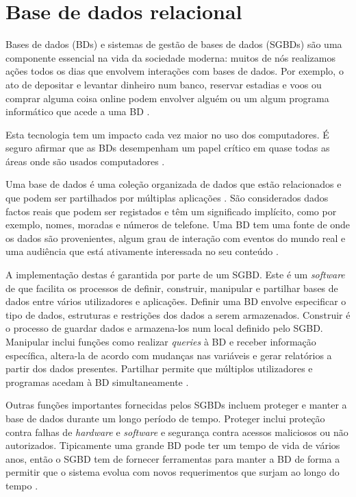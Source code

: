 \documentclass[11pt,twoside,a4paper]{report}
\begin{document}
\section{Base de dados relacional}
Bases de dados (BDs) e sistemas de gestão de bases de dados (SGBDs) são uma componente essencial na vida da sociedade moderna: muitos de nós realizamos ações todos os dias que envolvem interações com bases de dados. Por exemplo, o ato de depositar e levantar dinheiro num banco, reservar estadias e voos ou comprar alguma coisa online podem envolver alguém ou um algum programa informático que acede a uma BD \cite{Elmasri:2010:FDS:1855347}.\par
Esta tecnologia tem um impacto cada vez maior no uso dos computadores. É seguro afirmar que as BDs desempenham um papel crítico em quase todas as áreas onde são usados computadores \cite{Elmasri:2010:FDS:1855347}.\par
Uma base de dados é uma coleção organizada de dados que estão relacionados e que podem ser partilhados por múltiplas aplicações \cite{definicao_base_dados}. São considerados dados factos reais que podem ser registados e têm um significado implícito, como por exemplo, nomes, moradas e números de telefone. Uma BD tem uma fonte de onde os dados são provenientes, algum grau de interação com eventos do mundo real e uma audiência que está ativamente interessada no seu conteúdo \cite{Elmasri:2010:FDS:1855347}.\par
A implementação destas é garantida por parte de um SGBD. Este é um \textit{software} de que facilita os processos de definir, construir, manipular e partilhar bases de dados entre vários utilizadores e aplicações. Definir uma BD envolve especificar o tipo de dados, estruturas e restrições dos dados a serem armazenados. Construir é o processo de guardar dados e armazena-los num local definido pelo SGBD. Manipular inclui funções como realizar \textit{queries} à BD e receber informação específica, altera-la de acordo com mudanças nas variáveis e gerar relatórios a partir dos dados presentes. Partilhar permite que múltiplos utilizadores e programas acedam à BD simultaneamente \cite{Elmasri:2010:FDS:1855347}.\par
Outras funções importantes fornecidas pelos SGBDs incluem proteger e manter a base de dados durante um longo período de tempo. Proteger inclui proteção contra falhas de \textit{hardware} e \textit{software} e segurança contra acessos maliciosos ou não autorizados. Tipicamente uma grande BD pode ter um tempo de vida de vários anos, então o SGBD tem de fornecer ferramentas para manter a BD de forma a permitir que o sistema evolua com novos requerimentos que surjam ao longo do tempo \cite{Elmasri:2010:FDS:1855347}.
\end{document}

